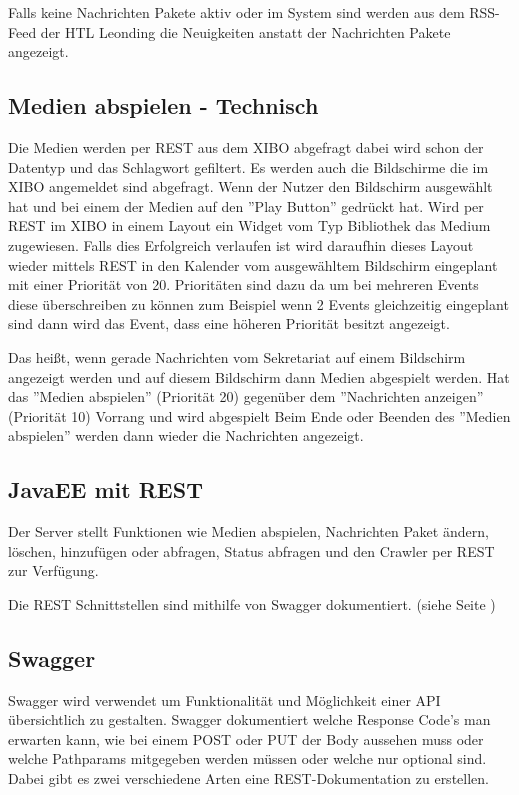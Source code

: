 Falls keine Nachrichten Pakete aktiv oder im System sind werden aus dem RSS-Feed der HTL Leonding die Neuigkeiten anstatt der Nachrichten Pakete angezeigt.

\subsection{Medien abspielen - Technisch}\label{sec:playmediatechnical}
Die Medien werden per REST aus dem XIBO abgefragt dabei wird schon der Datentyp und das Schlagwort gefiltert. Es werden auch die Bildschirme die im XIBO angemeldet sind abgefragt. Wenn der Nutzer den Bildschirm ausgewählt hat und bei einem der Medien auf den ''Play Button'' gedrückt hat. Wird per REST im XIBO in einem Layout ein Widget vom Typ Bibliothek das Medium zugewiesen. Falls dies Erfolgreich verlaufen ist wird daraufhin dieses Layout wieder mittels REST in den Kalender vom ausgewähltem Bildschirm eingeplant mit einer Priorität von 20. Prioritäten sind dazu da um bei mehreren Events diese überschreiben zu können zum Beispiel wenn 2 Events gleichzeitig eingeplant sind dann wird das Event, dass eine höheren Priorität besitzt angezeigt.

Das heißt, wenn gerade Nachrichten vom Sekretariat auf einem Bildschirm angezeigt werden und auf diesem Bildschirm dann Medien abgespielt werden. Hat das ''Medien abspielen'' (Priorität 20) gegenüber dem ''Nachrichten anzeigen'' (Priorität 10) Vorrang und wird abgespielt Beim Ende oder Beenden des ''Medien abspielen'' werden dann wieder die Nachrichten angezeigt.

\subsection{JavaEE mit REST}\label{sec:javaeeresttechnical}
Der Server stellt Funktionen wie Medien abspielen, Nachrichten Paket ändern, löschen, hinzufügen oder abfragen, Status abfragen und den Crawler per REST zur Verfügung.

Die REST Schnittstellen sind mithilfe von Swagger dokumentiert. (siehe Seite \pageref{sec:javaeeandroidrestswagger})

\subsection{Swagger}\label{sec:javaeeandroidrestswagger}
Swagger wird verwendet um Funktionalität und Möglichkeit einer API übersichtlich zu gestalten. Swagger dokumentiert welche Response Code's man erwarten kann, wie bei einem POST oder PUT der Body aussehen muss oder welche Pathparams mitgegeben werden müssen oder welche nur optional sind. Dabei gibt es zwei verschiedene Arten eine REST-Dokumentation zu erstellen.

